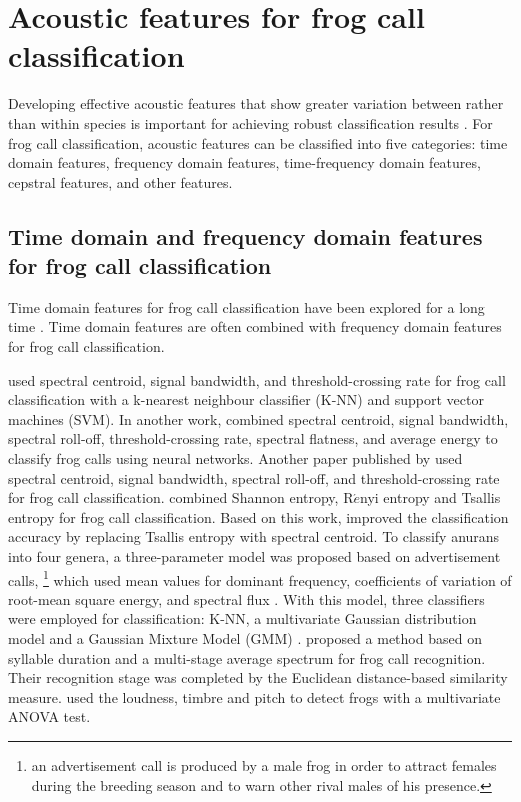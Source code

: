 \section{Acoustic features for frog call classification}
\label{features}
Developing effective acoustic features that show greater variation between rather than within species is important for achieving robust classification results \citep{Fox20081187}. For frog call classification, acoustic features can be classified into five categories: time domain features, frequency domain features, time-frequency domain features, cepstral features, and other features. 

\subsection{Time domain and frequency domain features for frog call classification}

Time domain features for frog call classification have been explored for a long time \citep{huang2008realization, huang2009frog, dayou2011classification, chen2012automatic, camacho2013automatic, Huang20141}. Time domain features are often combined with frequency domain features for frog call classification.
 
\cite{huang2009frog} used spectral centroid, signal bandwidth, and threshold-crossing rate for frog call classification with a k-nearest neighbour classifier (K-NN) and support vector machines (SVM). In another work, \cite{Huang20141} combined spectral centroid, signal bandwidth, spectral roll-off, threshold-crossing rate, spectral flatness, and average energy to classify frog calls using neural networks. Another paper published by  \citep{huang2008realization} used spectral centroid, signal bandwidth, spectral roll-off, and threshold-crossing rate for frog call classification. 
\cite{dayou2011classification} combined Shannon entropy, R$\acute{e}$nyi entropy and Tsallis entropy for frog call classification. Based on this work,  \cite{han2011acoustic} improved the classification accuracy by replacing Tsallis entropy with spectral centroid.
To classify anurans into four genera, a three-parameter model was proposed based on advertisement calls, \footnote[1]{an advertisement call is produced by a male frog in order to attract females during the breeding season and to warn other rival males of his presence.} which used mean values for dominant frequency, coefficients of variation of root-mean square energy, and spectral flux \citep{Gingras2013}. With this model, three classifiers  were employed for classification: K-NN, a multivariate Gaussian distribution model and a Gaussian Mixture Model (GMM) \citep{Gingras2013}.
\cite{chen2012automatic} proposed a method based on syllable duration and a multi-stage average spectrum for frog call recognition. Their recognition stage was completed by the Euclidean distance-based similarity measure. \cite{camacho2013automatic} used the loudness, timbre and pitch to detect frogs with a multivariate ANOVA test.







